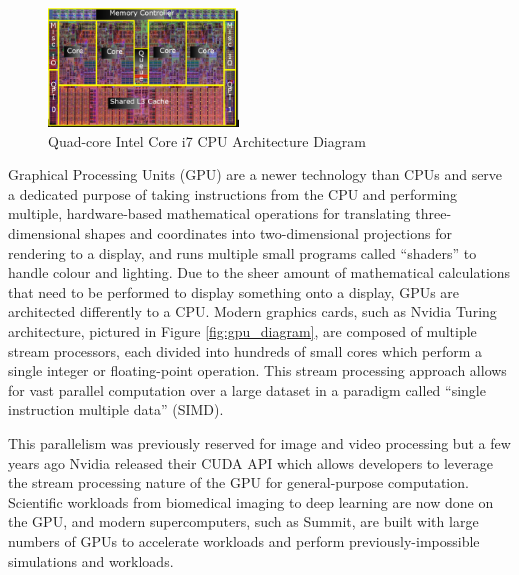 \documentclass[conference]{IEEEtran}
\begin{document}
\begin{figure}
\centering
\includegraphics[width=0.45\textwidth]{images/cpu_diagram.png}
\caption{Quad-core Intel Core i7 CPU Architecture Diagram}
\label{fig:cpu_diagram}
\end{figure}

Graphical Processing Units (GPU) are a newer technology than CPUs and serve a dedicated purpose of taking instructions from the CPU and performing multiple, hardware-based mathematical operations for translating three-dimensional shapes and coordinates into two-dimensional projections for rendering to a display, and runs multiple small programs called ``shaders” to handle colour and lighting. Due to the sheer amount of mathematical calculations that need to be performed to display something onto a display, GPUs are architected differently to a CPU. Modern graphics cards, such as Nvidia Turing architecture, pictured in Figure \ref{fig:gpu_diagram}, are composed of multiple stream processors, each divided into hundreds of small cores which perform a single integer or floating-point operation. This stream processing approach allows for vast parallel computation over a large dataset in a paradigm called ``single instruction multiple data” (SIMD).


This parallelism was previously reserved for image and video processing but a few years ago Nvidia released their CUDA API\cite{cuda_talk}\cite{CUDA} which allows developers to leverage the stream processing nature of the GPU for general-purpose computation. Scientific workloads from biomedical imaging\cite{luebke2008cuda} to deep learning\cite{tang2013deep} are now done on the GPU, and modern supercomputers, such as Summit, are built with large numbers of GPUs to accelerate workloads and perform previously-impossible simulations and workloads.
\end{document}
